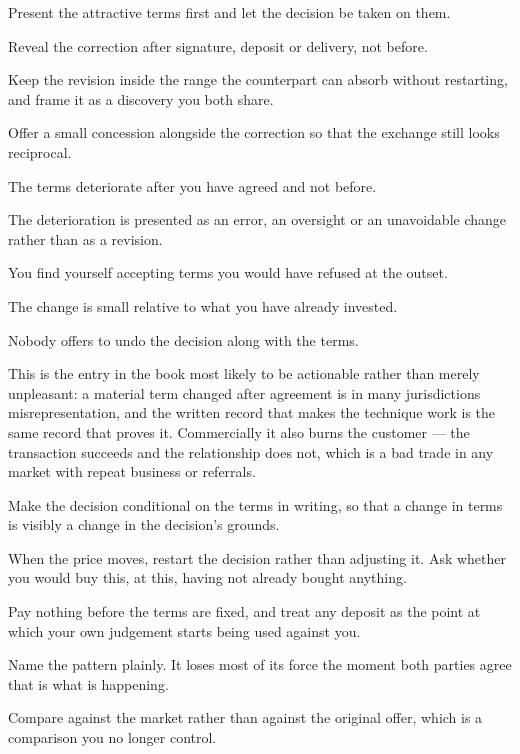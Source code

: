 \begin{application}
  \item Present the attractive terms first and let the decision be taken on them.
  \item Reveal the correction after signature, deposit or delivery, not before.
  \item Keep the revision inside the range the counterpart can absorb without restarting, and frame it as a discovery you both share.
  \item Offer a small concession alongside the correction so that the exchange still looks reciprocal.
\end{application}

\begin{feedback}
  \item The terms deteriorate after you have agreed and not before.
  \item The deterioration is presented as an error, an oversight or an unavoidable change rather than as a revision.
  \item You find yourself accepting terms you would have refused at the outset.
  \item The change is small relative to what you have already invested.
  \item Nobody offers to undo the decision along with the terms.
\end{feedback}

\begin{failure}
This is the entry in the book most likely to be actionable rather than merely unpleasant: a material term changed after agreement is in many jurisdictions misrepresentation, and the written record that makes the technique work is the same record that proves it. Commercially it also burns the customer --- the transaction succeeds and the relationship does not, which is a bad trade in any market with repeat business or referrals.
\end{failure}

\begin{countermeasures}
  \item Make the decision conditional on the terms in writing, so that a change in terms is visibly a change in the decision's grounds.
  \item When the price moves, restart the decision rather than adjusting it. Ask whether you would buy this, at this, having not already bought anything.
  \item Pay nothing before the terms are fixed, and treat any deposit as the point at which your own judgement starts being used against you.
  \item Name the pattern plainly. It loses most of its force the moment both parties agree that is what is happening.
  \item Compare against the market rather than against the original offer, which is a comparison you no longer control.
\end{countermeasures}

\seesources
{}
